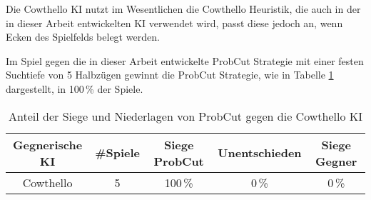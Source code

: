 Die Cowthello \ac{KI} nutzt im Wesentlichen die Cowthello Heuristik, die auch in der in dieser Arbeit entwickelten \ac{KI}
verwendet wird, passt diese jedoch an, wenn Ecken des Spielfelds belegt werden. \cite{cowthello}

Im Spiel gegen die in dieser Arbeit entwickelte ProbCut Strategie mit einer festen Suchtiefe von 5 Halbzügen gewinnt
die ProbCut Strategie, wie in Tabelle \ref{table:comp:cowthello} dargestellt, in 100\,\%  der Spiele.

\begin{table}[H]
\centering
\begin{tabular}{c|c|ccc}
\hline
Gegnerische \ac{KI} & \#Spiele & Siege ProbCut & Unentschieden & Siege Gegner \\
\hline
Cowthello & 5 & 100\,\% & 0\,\% & 0\,\% \\
\hline
\end{tabular}
\caption{Anteil der Siege und Niederlagen von ProbCut gegen die Cowthello KI}
\label{table:comp:cowthello}
\end{table}